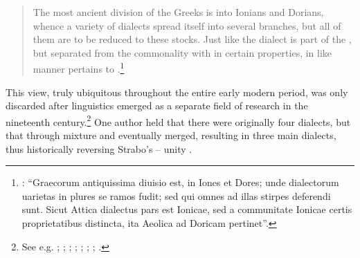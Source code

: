 \begin{quote}
The most ancient division of the Greeks is into Ionians and Dorians, whence a variety of dialects spread itself into several branches, but all of them are to be reduced to these stocks. Just like the  dialect is part of the , but separated from the commonality with  in certain properties, in like manner  pertains to .\footnote{\citet[143]{Grotius1648}: “Graecorum antiquissima diuisio est, in Iones et Dores; unde dialectorum uarietas in plures se ramos fudit; sed qui omnes ad illas stirpes deferendi sunt. Sicut Attica dialectus pars est Ionicae, sed a communitate Ionicae certis proprietatibus distincta, ita Aeolica ad Doricam pertinet”.}
\end{quote}

This view, truly ubiquitous throughout the entire early modern period, was only discarded after linguistics emerged as a separate field of research in the nineteenth century.\footnote{See e.g. \citet[64\textsc{\textsuperscript{r}}]{Sabellicus1490}; \citet[235]{Estienne1573}; \citet[563]{Lancelot1655}; \citet[\textsc{c.2}\textsc{\textsuperscript{r}}–\textsc{c.2}\textsc{\textsuperscript{v}}]{Schwartz1702}; \citet[i]{Maittaire1706}; \citet[82]{Vitringa1712}; \citet[\textsc{xv}]{Castelli1769}; \citet[\textsc{a.2}\textsc{\textsuperscript{r}}]{Hauptmann1776}.} One author held that there were originally four dialects, but that through mixture  and  eventually merged, resulting in three main dialects, thus historically reversing Strabo’s – unity \citep[20]{Gedike1782}.

